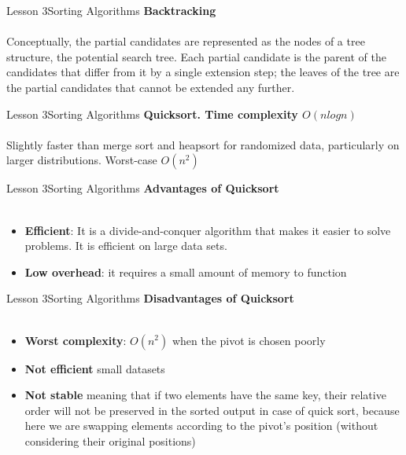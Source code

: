 \documentclass[aspectratio=1610]{beamer}
\begin{document}
\begin{frame}{Lesson 3}{Sorting Algorithms}
\LARGE
\textbf{Backtracking}\\~\\
\Large
Conceptually, the partial candidates are represented as the nodes of
a tree structure, the potential search tree. Each partial candidate
is the parent of the candidates that differ from it by a single
extension step; the leaves of the tree are the partial candidates
that cannot be extended any further.
\end{frame}




\begin{frame}{Lesson 3}{Sorting Algorithms}
\LARGE
\textbf{Quicksort. Time complexity $O(n log n)$}\\~\\
Slightly faster than merge sort and heapsort for randomized data,
particularly on larger distributions. Worst-case $O(n^{2})$
\end{frame}


\begin{frame}{Lesson 3}{Sorting Algorithms}
\LARGE
\textbf{Advantages of Quicksort}\\~\\
\Large
\begin{itemize}
	\item \textbf{Efficient}: It is a divide-and-conquer algorithm that makes it easier to solve problems. It is efficient on large data sets.
	\item \textbf{Low overhead}: it requires a small amount of memory to function
\end{itemize}
\end{frame}


\begin{frame}{Lesson 3}{Sorting Algorithms}
\LARGE
\textbf{Disadvantages of Quicksort}\\~\\
\Large
\begin{itemize}
	\item \textbf{Worst complexity}: $O(n^{2})$ when the pivot is chosen poorly
	\item \textbf{Not efficient} small datasets
	\item \textbf{Not stable} meaning that if two elements have the same key, their relative order will not be preserved in the sorted output in case of quick sort, because here we are swapping elements according to the pivot’s position (without considering their original positions)
\end{itemize}
\end{frame}
\end{document}

